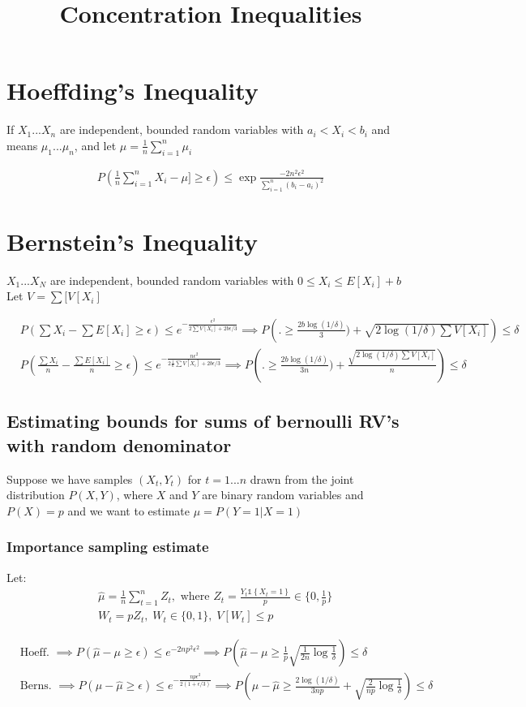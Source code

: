 \documentclass{article}
\title{Concentration Inequalities}
\newcommand{\set}[1]{\left\{#1\right\}}
\newcommand{\ind}[1]{\mathds{1}\!\!\set{#1}}
\newcommand{\eqn}[1]{\begin{align}#1\end{align}}
\theoremstyle{plain}
\theoremstyle{definition}
\begin{document}
\def\ci{\perp\!\!\!\perp}



\section{Hoeffding's Inequality}
If $X_1...X_n$ are independent, bounded random variables with $a_i < X_i < b_i$ and means $\mu_1...\mu_n$, and let $\mu = \frac{1}{n} \sum_{i=1}^n \mu_i$

\eqn {
P(\frac{1}{n}\sum_{i=1}^n X_i - \mu] \geq \epsilon) \leq \exp{\frac{-2n^2\epsilon^2}{\sum_{i=1}^n(b_i - a_i)^2}}
}



\section{Bernstein's Inequality}
$X_1...X_N$ are independent, bounded random variables with $0 \leq X_i \leq E[X_i]+b$ Let $V = \sum[V[X_i]$

\eqn{
&P(\sum X_i - \sum E[X_i] \geq \epsilon) \leq e^{-\frac{\epsilon^2}{2\sum V[X_i]+2b\epsilon/3}} \implies P\left(\boldsymbol{.} \geq \frac{2b\log(1/\delta)}{3})+\sqrt{2\log(1/\delta)\sum V[X_i]}\right)\leq \delta\\
&P(\frac{\sum X_i}{n} - \frac{\sum E[X_i]}{n} \geq \epsilon) \leq e^{-\frac{n\epsilon^2}{2\frac{1}{n}\sum V[X_i]+2b\epsilon/3}} \implies P\left(\boldsymbol{.} \geq \frac{2b\log(1/\delta)}{3n})+\frac{\sqrt{2\log(1/\delta)\sum V[X_i]}}{n}\right)\leq \delta
}


\subsection*{Estimating bounds for sums of bernoulli RV's with random denominator}
Suppose we have samples $(X_t,Y_t)$ for $t = 1... n$ drawn from the joint distribution $P(X,Y)$, where $X$ and $Y$ are binary random variables and $P(X) = p$ and we want to estimate $\mu = P(Y=1|X=1)$

\subsubsection*{Importance sampling estimate}
 Let: 
\eqn{
&\hat{\mu} = \frac{1}{n}\sum_{t=1}^nZ_t, \text{ where }
Z_t = \frac{Y_t \ind{X_t=1}}{p} \in \{0,\frac{1}{p}\}\\
&W_t = pZ_t, \; W_t \in \{0,1\},\; V[W_t] \leq p
}


\eqn{
&\text{Hoeff. } \implies P(\hat{\mu} - \mu \geq \epsilon) \leq e^{-2np^2\epsilon^2} 
\implies P(\hat{\mu} - \mu \geq \frac{1}{p}\sqrt{\frac{1}{2n}\log{\frac{1}{\delta}}}) \leq \delta \\
&\text{Berns. } \implies P(\mu -\hat{\mu}\geq \epsilon) \leq e^{-\frac{np\epsilon^2}{2(1+\epsilon/3)}} 
\implies P(\mu - \hat{\mu}\geq \frac{2\log(1/\delta)}{3np}+\sqrt{\frac{2}{np}\log{\frac{1}{\delta}}}) \leq \delta
}
\end{document}
